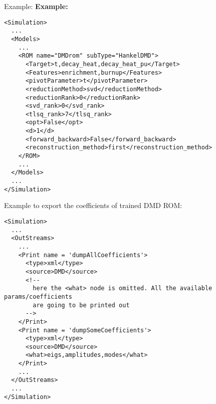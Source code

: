 \hspace{24pt}
Example:
\textbf{Example:}
\begin{lstlisting}[style=XML,morekeywords={name,subType}]
<Simulation>
  ...
  <Models>
    ...
    <ROM name="DMDrom" subType="HankelDMD">
      <Target>t,decay_heat,decay_heat_pu</Target>
      <Features>enrichment,burnup</Features>
      <pivotParameter>t</pivotParameter>
      <reductionMethod>svd</reductionMethod>
      <reductionRank>0</reductionRank>
      <svd_rank>0</svd_rank>
      <tlsq_rank>7</tlsq_rank>
      <opt>False</opt>
      <d>1</d>
      <forward_backward>False</forward_backward>
      <reconstruction_method>first</reconstruction_method>
    </ROM>
    ...
  </Models>
  ...
</Simulation>
\end{lstlisting}

Example to export the coefficients of trained DMD ROM:
\begin{lstlisting}[style=XML,morekeywords={name,subType}]
<Simulation>
  ...
  <OutStreams>
    ...
    <Print name = 'dumpAllCoefficients'>
      <type>xml</type>
      <source>DMD</source>
      <!--
        here the <what> node is omitted. All the available params/coefficients
        are going to be printed out
      -->
    </Print>
    <Print name = 'dumpSomeCoefficients'>
      <type>xml</type>
      <source>DMD</source>
      <what>eigs,amplitudes,modes</what>
    </Print>
    ...
  </OutStreams>
  ...
</Simulation>
\end{lstlisting}


